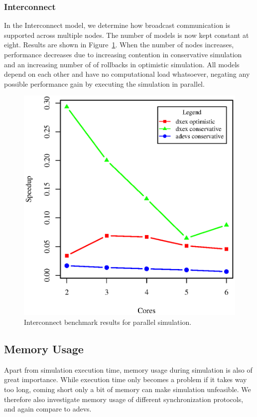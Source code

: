 \vspace{0.2cm}

\subsubsection{Interconnect}
In the Interconnect model, we determine how broadcast communication is supported across multiple nodes.
The number of models is now kept constant at eight.
Results are shown in Figure~\ref{fig:interconnect_benchmark_parallel}.
When the number of nodes increases, performance decreases due to increasing contention in conservative simulation and an increasing number of of rollbacks in optimistic simulation.
All models depend on each other and have no computational load whatsoever, negating any possible performance gain by executing the simulation in parallel.

\begin{figure}
    \center
    \includegraphics[width=\plotfraction\columnwidth]{fig/interconnect_parallel.eps}
    \caption{Interconnect benchmark results for parallel simulation.}
    \label{fig:interconnect_benchmark_parallel}
\end{figure}

\subsection{Memory Usage}
Apart from simulation execution time, memory usage during simulation is also of great importance.
While execution time only becomes a problem if it takes way too long, coming short only a bit of memory can make simulation unfeasible.
We therefore also investigate memory usage of different synchronization protocols, and again compare to adevs.

